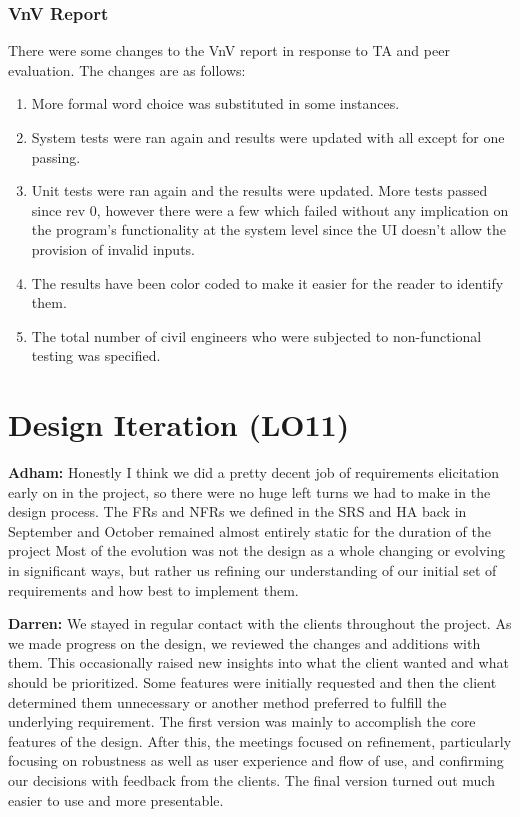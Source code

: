 \documentclass{article}
\begin{document}
\subsubsection{VnV Report}
There were some changes to the VnV report in response to TA and peer evaluation. The changes are as follows:
\begin{enumerate}
\item More formal word choice was substituted in some instances.
\item System tests were ran again and results were updated with all except for one passing.
\item Unit tests were ran again and the results were updated. More tests passed since rev 0, however there were a few which failed without any implication on the program's functionality at the system level since the UI doesn't allow the provision of invalid inputs.
\item The results have been color coded to make it easier for the reader to identify them.
\item The total number of civil engineers who were subjected to non-functional testing was specified.
\end{enumerate}
\section{Design Iteration (LO11)}


\textbf{Adham:} Honestly I think we did a pretty decent job of requirements elicitation early on in the project, so there were no huge left turns we had to make in the design
process. The FRs and NFRs we defined in the SRS and HA back in September and October remained almost entirely static for the duration of the project
Most of the evolution was not the design as a whole changing or evolving in significant ways, but rather us refining our understanding of our initial set of requirements
and how best to implement them.

\textbf{Darren:} We stayed in regular  contact with the clients throughout the project. As we made progress on the design, we reviewed the changes and additions with them. This occasionally raised new insights into what the client wanted and what should be prioritized. Some features were initially requested and then the client determined them unnecessary or another method preferred to fulfill the underlying requirement. The first version was mainly to accomplish the core features of the design. After this, the meetings focused on refinement, particularly focusing on robustness as well as user experience and flow of use, and confirming our decisions with feedback from the clients. The final version turned out much easier to use and more presentable.
\end{document}
